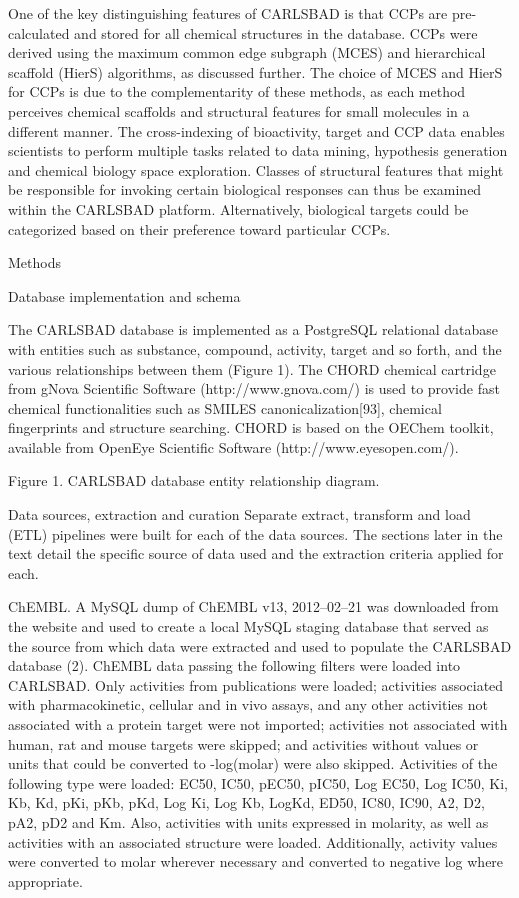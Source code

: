 One of the key distinguishing features of CARLSBAD is that CCPs are pre-calculated and stored for all chemical structures in the database. CCPs were derived using the maximum common edge subgraph (MCES) and hierarchical scaffold (HierS) algorithms, as discussed further. The choice of MCES and HierS for CCPs is due to the complementarity of these methods, as each method perceives chemical scaffolds and structural features for small molecules in a different manner. The cross-indexing of bioactivity, target and CCP data enables scientists to perform multiple tasks related to data mining, hypothesis generation and chemical biology space exploration. Classes of structural features that might be responsible for invoking certain biological responses can thus be examined within the CARLSBAD platform. Alternatively, biological targets could be categorized based on their preference toward particular CCPs.

Methods

Database implementation and schema

The CARLSBAD database is implemented as a PostgreSQL relational database with entities such as substance, compound, activity, target and so forth, and the various relationships between them (Figure 1). The CHORD chemical cartridge from gNova Scientific Software (http://www.gnova.com/) is used to provide fast chemical functionalities such as SMILES canonicalization[93], chemical fingerprints and structure searching. CHORD is based on the OEChem toolkit, available from OpenEye Scientific Software (http://www.eyesopen.com/).

Figure 1.
CARLSBAD database entity relationship diagram.

Data sources, extraction and curation
Separate extract, transform and load (ETL) pipelines were built for each of the data sources. The sections later in the text detail the specific source of data used and the extraction criteria applied for each.

ChEMBL. A MySQL dump of ChEMBL v13, 2012–02–21 was downloaded from the website and used to create a local MySQL staging database that served as the source from which data were extracted and used to populate the CARLSBAD database (2). ChEMBL data passing the following filters were loaded into CARLSBAD. Only activities from publications were loaded; activities associated with pharmacokinetic, cellular and in vivo assays, and any other activities not associated with a protein target were not imported; activities not associated with human, rat and mouse targets were skipped; and activities without values or units that could be converted to -log(molar) were also skipped. Activities of the following type were loaded: EC50, IC50, pEC50, pIC50, Log EC50, Log IC50, Ki, Kb, Kd, pKi, pKb, pKd, Log Ki, Log Kb, LogKd, ED50, IC80, IC90, A2, D2, pA2, pD2 and Km. Also, activities with units expressed in molarity, as well as activities with an associated structure were loaded. Additionally, activity values were converted to molar wherever necessary and converted to negative log where appropriate.

